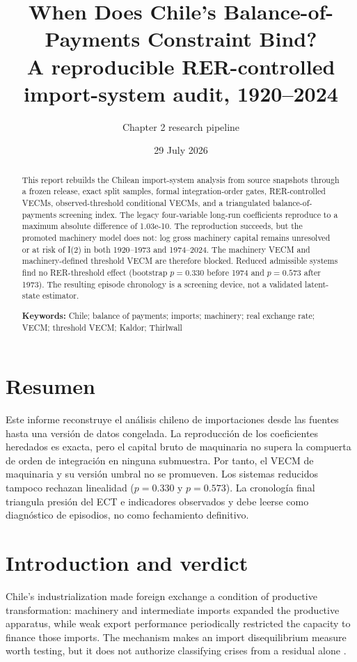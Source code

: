 \documentclass[11pt]{article}
\title{\textbf{When Does Chile's Balance-of-Payments Constraint Bind?}\\
\large A reproducible RER-controlled import-system audit, 1920--2024}
\author{Chapter 2 research pipeline}
\date{29 July 2026}
\begin{document}
\maketitle

\begin{abstract}
This report rebuilds the Chilean import-system analysis from source snapshots through a frozen release, exact split samples, formal integration-order gates, RER-controlled VECMs, observed-threshold conditional VECMs, and a triangulated balance-of-payments screening index. The legacy four-variable long-run coefficients reproduce to a maximum absolute difference of 1.03e-10. The reproduction succeeds, but the promoted machinery model does not: log gross machinery capital remains unresolved or at risk of I(2) in both 1920--1973 and 1974--2024. The machinery VECM and machinery-defined threshold VECM are therefore blocked. Reduced admissible systems find no RER-threshold effect (bootstrap $p=0.330$ before 1974 and $p=0.573$ after 1973). The resulting episode chronology is a screening device, not a validated latent-state estimator.

\vspace{0.5em}\noindent\textbf{Keywords:} Chile; balance of payments; imports; machinery; real exchange rate; VECM; threshold VECM; Kaldor; Thirlwall
\end{abstract}

\FloatBarrier
\section*{Resumen}
Este informe reconstruye el análisis chileno de importaciones desde las fuentes hasta una versión de datos congelada. La reproducción de los coeficientes heredados es exacta, pero el capital bruto de maquinaria no supera la compuerta de orden de integración en ninguna submuestra. Por tanto, el VECM de maquinaria y su versión umbral no se promueven. Los sistemas reducidos tampoco rechazan linealidad ($p=0.330$ y $p=0.573$). La cronología final triangula presión del ECT e indicadores observados y debe leerse como diagnóstico de episodios, no como fechamiento definitivo.

\FloatBarrier
\section{Introduction and verdict}

Chile's industrialization made foreign exchange a condition of productive transformation: machinery and intermediate imports expanded the productive apparatus, while weak export performance periodically restricted the capacity to finance those imports. The mechanism makes an import disequilibrium measure worth testing, but it does not authorize classifying crises from a residual alone \citep{bcch2025,alvarez2003}.
\end{document}
